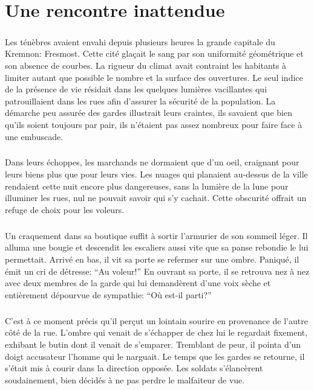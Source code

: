 \chapter{Une rencontre inattendue}

\paragraph{}
Les ténèbres avaient envahi depuis plusieurs heures la grande capitale du
Kremnon: Fresmost. Cette cité glaçait le sang par son uniformité géométrique
et son absence de courbes. La rigueur du climat avait contraint les habitants
à limiter autant que possible le nombre et la surface des ouvertures. Le seul
indice de la présence de vie résidait dans les quelques lumières vacillantes
qui patrouillaient dans les rues afin d'assurer la sécurité de la population.
La démarche peu assurée des gardes illustrait leurs craintes, ils savaient
que bien qu'ils soient toujours par pair, ils n'étaient pas assez nombreux
pour faire face à une embuscade.

\paragraph{}
Dans leurs échoppes, les marchands ne dormaient que d'un oeil, craignant pour
leurs biens plus que pour leurs vies. Les nuages qui planaient au-dessus de la
ville rendaient cette nuit encore plus dangereuses, sans la lumière de la lune
pour illuminer les rues, nul ne pouvait savoir qui s'y cachait. Cette
obscurité offrait un refuge de choix pour les voleurs.

\paragraph{}
Un craquement dans sa boutique suffit à sortir l'armurier de son sommeil
léger. Il alluma une bougie et descendit les escaliers aussi vite que sa panse
rebondie le lui permettait. Arrivé en bas, il vit sa porte se refermer sur une
ombre. Paniqué, il émit un cri de détresse: ``Au voleur!'' En ouvrant sa
porte, il se retrouva nez à nez avec deux membres de la garde qui lui
demandèrent d'une voix sèche et entièrement dépourvue de sympathie:
``Où est-il parti?''

\paragraph{}
C'est à ce moment précis qu'il perçut un lointain sourire en provenance de
l'autre côté de la rue. L'ombre qui venait de s'échapper de chez lui le
regardait fixement, exhibant le butin dont il venait de s'emparer. Tremblant
de peur, il pointa d'un doigt accusateur l'homme qui le narguait. Le temps que
les gardes se retourne, il s'était mis à courir dans la direction opposée. Les
soldats s'élancèrent soudainement, bien décidés à ne pas perdre le malfaiteur
de vue.

